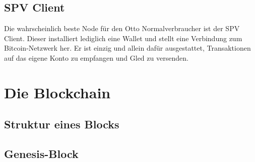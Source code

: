 \subsection{SPV Client}
Die wahrscheinlich beste Node für den Otto Normalverbraucher ist der SPV Client. Dieser installiert lediglich eine Wallet und
stellt eine Verbindung zum Bitcoin-Netzwerk her. Er ist einzig und allein dafür ausgestattet, Transaktionen auf das eigene Konto
zu empfangen und Gled zu versenden. 

\section{Die Blockchain}
\subsection{Struktur eines Blocks}
\subsection{Genesis-Block}
